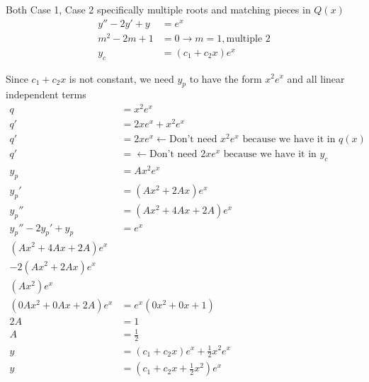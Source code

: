 \begin{case}
Both Case 1, Case 2 specifically multiple roots and matching pieces in $Q(x)$
\begin{align*}
    y''-2y'+y&=e^x\\
    m^2-2m+1&=0 \rightarrow m=1, \text{multiple }2\\
    y_c&= \left( c_1+c_2x\right) e^x
\end{align*}
\begin{step} Since $c_1+c_2x$ is not constant, we need $y_p$ to have the form $x^2e^x$ and all linear independent terms
\begin{align*}
    q&=x^2e^x\\
    q'&=2xe^x+x^2e^x\\
    q'&=2xe^x \leftarrow \text{Don't need $x^2e^x$ because we have it in $q(x)$}\\
    q'&= \leftarrow \text{Don't need $2xe^x$ because we have it in $y_c$}\\
    y_p&=Ax^2e^x\\
    y_p'&=\left( Ax^2+2Ax\right) e^x\\
    y_p''&= \left( Ax^2+4Ax+2A \right) e^x\\
    y_p''-2y_p'+y_p&=e^x\\
    (Ax^2+4Ax+2A)e^x\\
    -2(Ax^2+2Ax)e^x\\
    (Ax^2)e^x\\
    (0Ax^2+0Ax+2A)e^x&= e^x(0x^2+0x+1)\\
    2A&=1\\
    A&=\frac{1}{2}\\
    y&=(c_1+c_2x)e^x+\frac{1}{2}x^2e^x\\
    y&=(c_1+c_2x+\frac{1}{2}x^2)e^x
\end{align*}
\end{step}
\end{case}